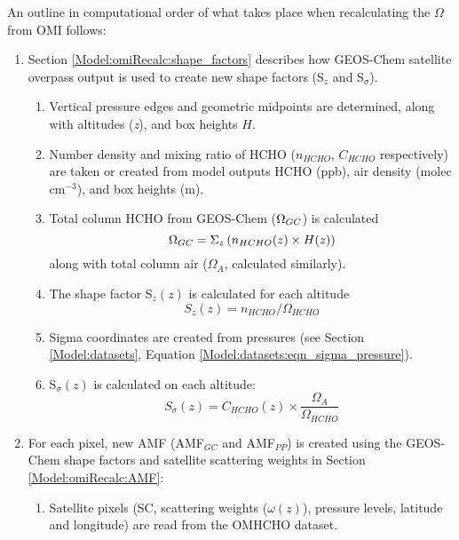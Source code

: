     An outline in computational order of what takes place when recalculating the $\Omega$ from OMI follows:
    \begin{enumerate}
      \item Section \ref{Model:omiRecalc:shape_factors} describes how GEOS-Chem satellite overpass output %
        is used to create new shape factors (S$_z$ and S$_\sigma$).
      \begin{enumerate}
        \item Vertical pressure edges and geometric midpoints are determined, along with altitudes (\textit{z}), and box heights $H$.
        \item Number density and mixing ratio of HCHO ($n_{HCHO}$, $C_{HCHO}$ respectively) are taken or created from model outputs HCHO (ppb), air density (molec cm$^{-3}$), and box heights (m).
        \item Total column HCHO from GEOS-Chem ($\Omega_{GC}$) is calculated 
        \begin{equation*}
          \Omega_{GC} = \Sigma_z \left(n_{HCHO}(z) \times H(z) \right)
        \end{equation*}
        along with total column air ($\Omega_{A}$, calculated similarly).
        \item The shape factor S$_z(z)$ is calculated for each altitude 
        \begin{equation*}
          S_z(z) = n_{HCHO} / \Omega_{HCHO}
        \end{equation*}
        \item Sigma coordinates are created from pressures (see Section \ref{Model:datasets}, Equation \ref{Model:datasets:eqn_sigma_pressure}).
        \item S$_\sigma(z)$ is calculated on each altitude: 
        \begin{equation*}
          S_\sigma(z) = C_{HCHO}(z) \times \frac{\Omega_A}{\Omega_{HCHO}}
        \end{equation*}
      \end{enumerate}
      \item For each pixel, new AMF (AMF$_{GC}$ and AMF$_{PP}$) is created using the GEOS-Chem shape factors and satellite scattering weights in Section \ref{Model:omiRecalc:AMF}:
      \begin{enumerate}
        \item Satellite pixels (SC, scattering weights ($\omega(z)$), pressure levels, latitude and longitude) are read from the OMHCHO dataset.

\end{enumerate}
\end{enumerate}
